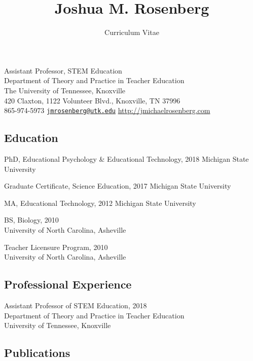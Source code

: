 \documentclass[]{article}
\title{Joshua M. Rosenberg}
\author{Curriculum Vitae}
\date{}
\begin{document}
\maketitle

\begingroup
\center

Assistant Professor, STEM Education\\
Department of Theory and Practice in Teacher Education\\
The University of Tennessee, Knoxville\\
420 Claxton, 1122 Volunteer Blvd., Knoxville, TN 37996\\
865-974-5973 \textbar{}
\href{mailto:jmrosenberg@utk.edu}{\nolinkurl{jmrosenberg@utk.edu}}
\textbar{} \url{http://jmichaelrosenberg.com}\\
\endgroup

\hypertarget{education}{%
\subsection{Education}\label{education}}

PhD, Educational Psychology \& Educational Technology, 2018 Michigan
State University

Graduate Certificate, Science Education, 2017 Michigan State University

MA, Educational Technology, 2012 Michigan State University

BS, Biology, 2010\\
University of North Carolina, Asheville

Teacher Licensure Program, 2010\\
University of North Carolina, Asheville

\hypertarget{professional-experience}{%
\subsection{Professional Experience}\label{professional-experience}}

Assistant Professor of STEM Education, 2018\\
Department of Theory and Practice in Teacher Education\\
University of Tennessee, Knoxville

\hypertarget{publications}{%
\subsection{Publications}\label{publications}}
\end{document}
